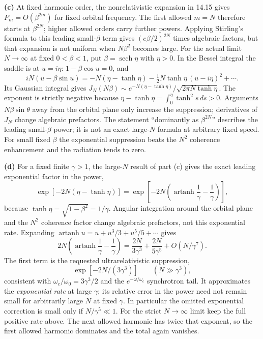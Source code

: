 \textbf{(c)} At fixed harmonic order, the nonrelativistic expansion in
14.15 gives $P_m=O(\beta^{2m})$ for fixed orbital frequency. The first
allowed $m=N$ therefore starts at $\beta^{2N}$; higher allowed orders
carry further powers. Applying Stirling's formula to this leading
small-$\beta$ term gives $(e\beta/2)^{2N}$ times algebraic factors,
but that expansion is not uniform when $N\beta^2$ becomes large.
For the actual limit $N\to\infty$ at fixed $0<\beta<1$, put
$\beta=\operatorname{sech}\eta$ with $\eta>0$.
In the Bessel integral the saddle is at $u=i\eta$:
$1-\beta\cos u=0$, and
\[
iN(u-\beta\sin u)
=-N(\eta-\tanh\eta)-\tfrac12N\tanh\eta\,(u-i\eta)^2+\cdots.
\]
Its Gaussian integral gives
$J_N(N\beta)\sim
e^{-N(\eta-\tanh\eta)}/\sqrt{2\pi N\tanh\eta}$.
The exponent is strictly negative because
$\eta-\tanh\eta=\int_0^\eta\tanh^2s\,ds>0$.
Arguments $N\beta\sin\theta$ away from the orbital plane only increase
the suppression; derivatives of $J_N$ change algebraic prefactors.
The statement
``dominantly as $\beta^{2N}$'' describes the leading small-$\beta$
power; it is not an exact large-$N$ formula at arbitrary fixed speed.
For small fixed $\beta$ the exponential suppression beats the $N^2$
coherence enhancement and the radiation tends to zero.

\textbf{(d)} For a fixed finite $\gamma>1$, the large-$N$ result of
part (c) gives the exact leading exponential factor in the power,
\[
\exp[-2N(\eta-\tanh\eta)]
=\exp\left[-2N\left(\operatorname{artanh}\frac1\gamma
-\frac1\gamma\right)\right],
\]
because $\tanh\eta=\sqrt{1-\beta^2}=1/\gamma$.
Angular integration around the orbital plane and the $N^2$ coherence
factor change algebraic prefactors, not this exponential rate. Expanding
$\operatorname{artanh}u=u+u^3/3+u^5/5+\cdots$ gives
\[
2N\left(\operatorname{artanh}\frac1\gamma-\frac1\gamma\right)
=\frac{2N}{3\gamma^3}+\frac{2N}{5\gamma^5}
+O(N/\gamma^7).
\]
The first term is the requested ultrarelativistic suppression,
\[
\boxed{\exp[-2N/(3\gamma^3)]\qquad(N\gg\gamma^3),}
\]
consistent with $\omega_c/\omega_0=3\gamma^3/2$ and the
$e^{-\omega/\omega_c}$ synchrotron tail. It approximates the
\emph{exponential rate} at large $\gamma$; its relative error in the
power need not remain small for arbitrarily large $N$ at fixed $\gamma$.
In particular the omitted exponential correction is small only if
$N/\gamma^5\ll1$. For the strict $N\to\infty$ limit keep the full
positive rate above. The next allowed harmonic has twice that exponent,
so the first allowed harmonic dominates and the total again vanishes.

